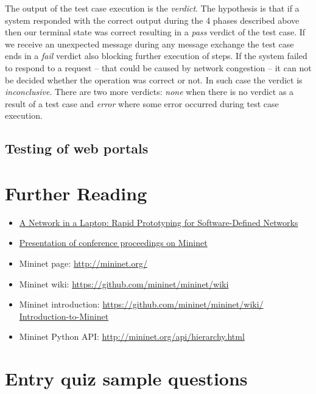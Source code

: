 \documentclass[a4paper]{article}
\begin{document}
The output of the test case execution is the \emph{verdict}. The hypothesis is that if a system responded with the correct output during the 4 phases described above then our terminal state was correct resulting in a \emph{pass} verdict of the test case. If we receive an unexpected message during any message exchange the test case ends in a \emph{fail} verdict also blocking further execution of steps. If the system failed to respond to a request -- that could be caused by network congestion -- it can not be decided whether the operation was correct or not. In such case the verdict is \emph{inconclusive}. There are two more verdicts: \emph{none} when there is no verdict as a result of a test case and \emph{error} where some error occurred during test case execution.


\subsection{Testing of web portals}





\section{Further Reading}

\begin{itemize}
    \item \href{https://qosip.tmit.bme.hu/foswiki/pub/Meres/OpenFlowMScMeresiSegedlet/a19-lantz.pdf}{A Network in a
              Laptop: Rapid Prototyping for Software-Defined Networks}
    \item

          \href{https://qosip.tmit.bme.hu/foswiki/pub/Meres/OpenFlowMScMeresiSegedlet/mininet-hotnets2010-final.pdf}{Presentation
              of conference proceedings on Mininet}
    \item	Mininet page: \url{http://mininet.org/}
    \item	Mininet wiki: \url{https://github.com/mininet/mininet/wiki}
    \item	Mininet introduction: \url{https://github.com/mininet/mininet/wiki/  Introduction-to-Mininet}
    \item	Mininet Python API: \url{http://mininet.org/api/hierarchy.html}
\end{itemize}

\appendix

\section{Entry quiz sample questions}
\end{document}
